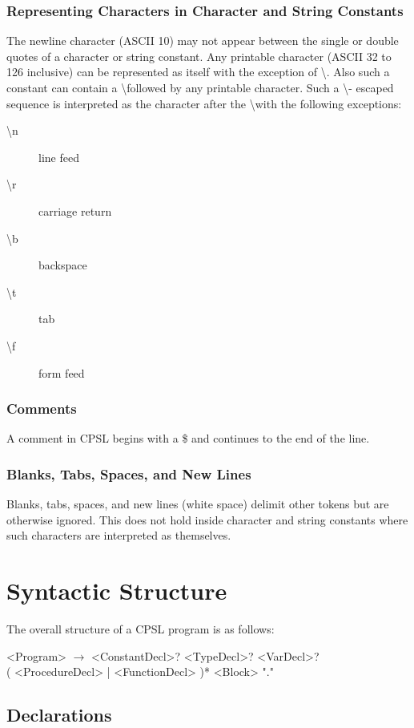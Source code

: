 \documentclass{book}
\begin{document}
\subsection{Representing Characters in Character and String Constants}
The newline character (ASCII 10) may not appear between the single or double quotes of a character or string constant.
Any printable character (ASCII 32 to 126 inclusive) can be represented
as itself with the exception of \textbackslash.
Also such a constant can contain a \textbackslash followed by any printable character.  Such a \textbackslash - escaped sequence is interpreted as the character after the \textbackslash with the following exceptions:
\begin{description}
\item[\textbackslash n] line feed
\item[\textbackslash r] carriage return
\item[\textbackslash b] backspace
\item[\textbackslash t] tab
\item[\textbackslash f] form feed 
\end{description}

\subsection{Comments}
A comment in CPSL begins with a \$ and continues to the end of the line.
\subsection{Blanks, Tabs, Spaces, and New Lines}
Blanks, tabs, spaces, and new lines (white space) delimit other tokens but are otherwise ignored.  This does not hold inside character and string constants where such characters are interpreted as themselves.

\chapter{Syntactic Structure}
The overall structure of a CPSL program is as follows:
\begin{grammar}
<Program> $\rightarrow$ <ConstantDecl>? <TypeDecl>? <VarDecl>? \\
( <ProcedureDecl> | <FunctionDecl> )* <Block> "."
\end{grammar}

\section{Declarations}
\end{document}
